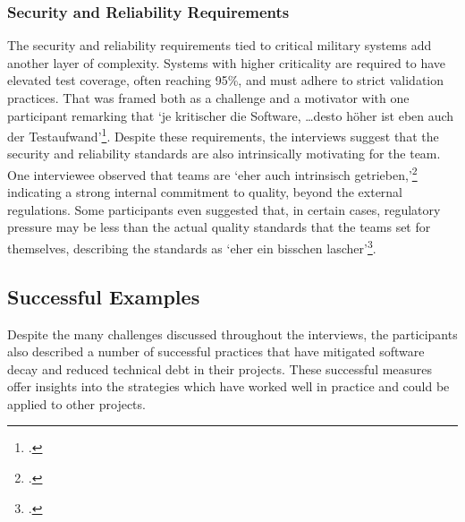 \subsubsection{Security and Reliability Requirements}
The security and reliability requirements tied to critical military systems add another layer of complexity. Systems with higher criticality are required to have elevated test coverage, often reaching 95\%, and must adhere to strict validation practices. That was framed both as a challenge and a motivator
with one participant remarking that `je kritischer die Software, \ldots desto höher ist eben auch der Testaufwand'\footcite{Interview22025}.
Despite these requirements, the interviews suggest that the security and reliability standards are also intrinsically motivating for the team. One interviewee observed that teams are `eher auch intrinsisch getrieben,'\footcite{Interview32025} indicating a strong internal commitment to quality, beyond the external regulations. 
Some participants even suggested that, in certain cases, regulatory pressure may be less than the actual quality standards that the teams set for themselves, describing the standards as `eher ein bisschen lascher'\footcite{Interview32025}.

\subsection{Successful Examples}
Despite the many challenges discussed throughout the interviews, the participants also described a number of successful practices that have mitigated software decay and reduced technical debt in their projects. These successful measures offer insights into the strategies which have worked well in practice and could be applied to other projects.

